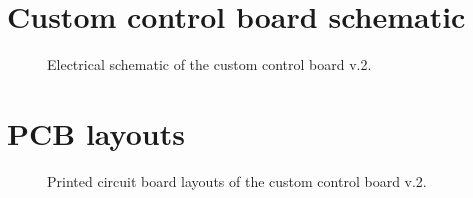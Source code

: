 
\cleardoublepage

{}
\cleardoublepage

\clearpage

\appendices
{} 

\cleardoublepage


\cleardoublepage

\section{Custom control board schematic}\label{ape:schematic}
\begin{figure}[h]
\centering
\caption*{Electrical schematic of the custom control board v.2.}
\end{figure}
\cleardoublepage

\section{PCB layouts}\label{ape:pcb}
\begin{figure}[h]
\centering
\caption*{Printed circuit board layouts of the custom control board v.2.}
\end{figure}


